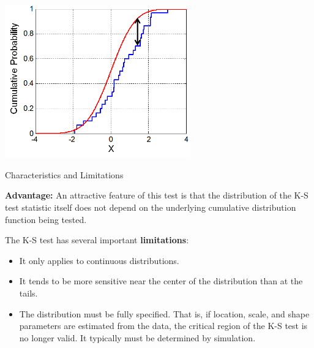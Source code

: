 \documentclass{beamer}
\begin{document}
\begin{frame}
{\centerline{}}


\begin{center}
\includegraphics[width=8cm]{P2023.AIBCCSS.InferenceAndLogisticRegression/KS_Example.png}
\end{center}

\end{frame}

\begin{frame}
{\centerline{Characteristics and Limitations}}
\textbf{Advantage:} An attractive feature of this test is that the distribution of the K-S test statistic itself does not depend on the underlying cumulative distribution function being tested.
\newline

The K-S test has several important \textbf{limitations}:
\begin{itemize}
\item It only applies to continuous distributions.
\item It tends to be more sensitive near the center of the distribution than at the tails.
\item The distribution must be fully specified. That is, if location, scale, and shape parameters are estimated from the data, the critical region of the K-S test is no longer valid. It typically must be determined by simulation.
\end{itemize}
\end{frame}
\end{document}
